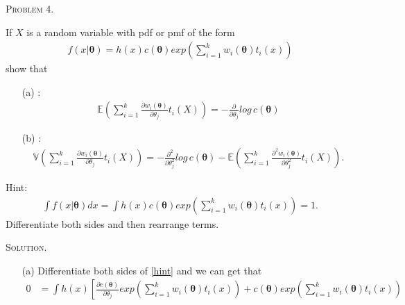 \documentclass{article}
\begin{document}
\begin{CJK}{UTF8}{gbsn}
    \begin{shaded}
        \noindent\textsc{Problem 4.}\par
        If $X$ is a random variable with pdf or pmf of the form
        \begin{align}
            f(x|\boldsymbol{\theta}) = h(x)c(\boldsymbol{\theta})exp\left ( \sum_{i=1}^k w_i(\boldsymbol{\theta})t_i(x)\right )
        \end{align}
        show that
        \begin{itemize}
            \item [(a)]:
                  \begin{align}
                      \mathbb{E}\left (\sum_{i=1}^k \frac{\partial w_i(\boldsymbol{\theta})}{\partial \theta_j}t_i(X) \right ) = -\frac{\partial}{\partial \theta_j}log\, c(\boldsymbol{\theta})\label{a}
                  \end{align}
            \item [(b)]:
                  \begin{align}
                      \mathbb{V}\left (\mathop{\sum}_{i=1}^k \frac{\partial w_i(\boldsymbol{\theta})}{\partial \theta_j }t_i(X) \right )
                      = -\frac{\partial^2}{\partial \theta_j^2}log\, c(\boldsymbol{\theta}) - \mathbb{E}\left (\sum_{i=1}^k \frac{\partial^2 w_i(\boldsymbol{\theta})}{\partial \theta_j^2} t_i(X) \right ).\label{b}
                  \end{align}
        \end{itemize}
        Hint:
        \begin{align}
            \int f(x|\boldsymbol{\theta}) dx = \int h(x)c(\boldsymbol{\theta})
            exp\left (\sum_{i=1}^k w_i(\boldsymbol{\theta})t_i(x) \right ) =1.\label{hint}
        \end{align}
        Differentiate both sides and then rearrange terms.
    \end{shaded}
    \noindent\textsc{Solution.}\par
    \begin{itemize}
        \item [(a)] Differentiate both sides of \eqref{hint} and we can get that
              \begin{align}
                  0 & = \int h(x) \left [\frac{\partial c(\boldsymbol{\theta})}{\partial \theta_j}
                      exp\left (\sum_{i=1}^kw_i(\boldsymbol{\theta})t_i(x) \right ) +
                      c(\boldsymbol{\theta})exp\left (\sum_{i=1}^kw_i(\boldsymbol{\theta})t_i(x) \right )

\end{align}
\end{itemize}
\end{CJK}
\end{document}

